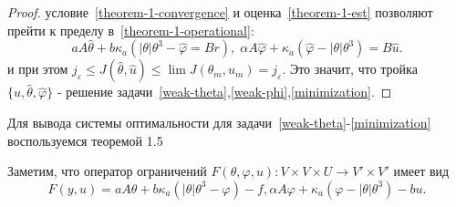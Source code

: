 \documentclass[10pt]{article}
\begin{document}
\begin{proof}
        условие~\eqref{theorem-1-convergence} и оценка~\eqref{theorem-1-est} позволяют прейти
        к пределу в~\eqref{theorem-1-operational}:
        \[
            a A \hat{\theta} + b \kappa_a (|\theta|\theta^3 - \hat{\varphi} = Br), \;
            \alpha A \hat{\varphi} + \kappa_a (\hat{\varphi} -|\theta|\theta^3) = B \hat{u}.
        \]
        и при этом $j_\varepsilon \leq J(\hat{\theta}, \hat{u}) \leq \lim J(\theta_m, u_m) =
        j_\varepsilon$.
        Это значит, что тройка $\{ \hat{u}, \hat{\theta}, \hat{\varphi} \}$ -
        решение задачи~\eqref{weak-theta},\eqref{weak-phi},\eqref{minimization}.
    \end{proof}

    Для вывода системы оптимальности для задачи~\eqref{weak-theta}-\eqref{minimization}
    воспользуемся теоремой 1.5~\cite{???}

    Заметим, что оператор ограничений
    $F(\theta, \varphi, u) : V \times V \times U \rightarrow V' \times V'$
    имеет вид
    \[
        F(y, u) = { aA\theta + b \kappa_a (|\theta|\theta^3 - \varphi) - f,
        \alpha A \varphi + \kappa_a (\varphi -|\theta| \theta^3) - bu}.
    \]
\end{document}
